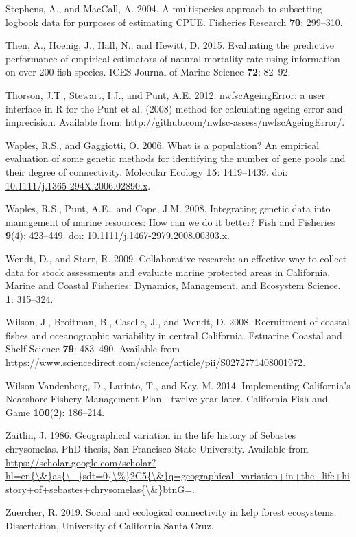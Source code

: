 \documentclass[12pt,]{article}
\begin{document}
\hypertarget{ref-Stephens2004}{}
Stephens, A., and MacCall, A. 2004. A multispecies approach to
subsetting logbook data for purposes of estimating CPUE. Fisheries
Research \textbf{70}: 299--310.

\hypertarget{ref-Then2015}{}
Then, A., Hoenig, J., Hall, N., and Hewitt, D. 2015. Evaluating the
predictive performance of empirical estimators of natural mortality rate
using information on over 200 fish species. ICES Journal of Marine
Science \textbf{72}: 82--92.

\hypertarget{ref-Thorson2012}{}
Thorson, J.T., Stewart, I.J., and Punt, A.E. 2012. nwfscAgeingError: a
user interface in R for the Punt et al. (2008) method for calculating
ageing error and imprecision. Available from:
http://github.com/nwfsc-assess/nwfscAgeingError/.

\hypertarget{ref-Waples2006}{}
Waples, R.S., and Gaggiotti, O. 2006. What is a population? An empirical
evaluation of some genetic methods for identifying the number of gene
pools and their degree of connectivity. Molecular Ecology \textbf{15}:
1419--1439. doi:
\href{https://doi.org/10.1111/j.1365-294X.2006.02890.x}{10.1111/j.1365-294X.2006.02890.x}.

\hypertarget{ref-Waples2008}{}
Waples, R.S., Punt, A.E., and Cope, J.M. 2008. Integrating genetic data
into management of marine resources: How can we do it better? Fish and
Fisheries \textbf{9}(4): 423--449. doi:
\href{https://doi.org/10.1111/j.1467-2979.2008.00303.x}{10.1111/j.1467-2979.2008.00303.x}.

\hypertarget{ref-Wendt2009}{}
Wendt, D., and Starr, R. 2009. Collaborative research: an effective way
to collect data for stock assessments and evaluate marine protected
areas in California. Marine and Coastal Fisheries: Dynamics, Management,
and Ecosystem Science. \textbf{1}: 315--324.

\hypertarget{ref-Wilson2008}{}
Wilson, J., Broitman, B., Caselle, J., and Wendt, D. 2008. Recruitment
of coastal fishes and oceanographic variability in central California.
Estuarine Coastal and Shelf Science \textbf{79}: 483--490. Available
from
\url{https://www.sciencedirect.com/science/article/pii/S0272771408001972}.

\hypertarget{ref-Vandenberg2014}{}
Wilson-Vandenberg, D., Larinto, T., and Key, M. 2014. Implementing
California's Nearshore Fishery Management Plan - twelve year later.
California Fish and Game \textbf{100}(2): 186--214.

\hypertarget{ref-Zaitlin1986}{}
Zaitlin, J. 1986. Geographical variation in the life history of Sebastes
chrysomelas. PhD thesis, San Francisco State University. Available from
\href{https://scholar.google.com/scholar?hl=en\%7B/\&\%7Das\%7B/_\%7Dsdt=0\%7B/\%\%7D2C5\%7B/\&\%7Dq=geographical+variation+in+the+life+history+of+sebastes+chrysomelas\%7B/\&\%7DbtnG=}{https://scholar.google.com/scholar?hl=en\{\textbackslash{}\&\}as\{\textbackslash{}\_\}sdt=0\{\textbackslash{}\%\}2C5\{\textbackslash{}\&\}q=geographical+variation+in+the+life+history+of+sebastes+chrysomelas\{\textbackslash{}\&\}btnG=}.

\hypertarget{ref-Zuercher2019}{}
Zuercher, R. 2019. Social and ecological connectivity in kelp forest
ecosystems. Dissertation, University of California Santa Cruz.
\end{document}
